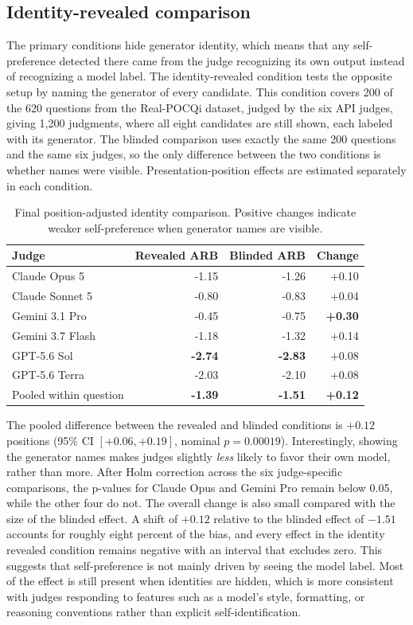 \documentclass[11pt]{article}
\begin{document}
\subsection{Identity-revealed comparison}

The primary conditions hide generator identity, which means that any self-preference detected there came from the judge recognizing its own output instead of recognizing a model label. The identity-revealed condition tests the opposite setup by naming the generator of every candidate. This condition covers 200 of the 620 questions from the Real-POCQi dataset, judged by the six API judges, giving 1,200 judgments, where all eight candidates are still shown, each labeled with its generator. The blinded comparison uses exactly the same 200 questions and the same six judges, so the only difference between the two conditions is whether names were visible. Presentation-position effects are estimated separately in each condition.


\begin{table}[htbp]
\centering
\small
\caption{Final position-adjusted identity comparison. Positive changes indicate
weaker self-preference when generator names are visible.}
\label{tab:identity}
\begin{tabular}{lrrr}
\toprule
Judge & Revealed ARB & Blinded ARB & Change \\
\midrule
Claude Opus 5 & -1.15 & -1.26 & +0.10 \\
Claude Sonnet 5 & -0.80 & -0.83 & +0.04 \\
Gemini 3.1 Pro & -0.45 & -0.75 & \textbf{+0.30} \\
Gemini 3.7 Flash & -1.18 & -1.32 & +0.14 \\
GPT-5.6 Sol & \textbf{-2.74} & \textbf{-2.83} & +0.08 \\
GPT-5.6 Terra & -2.03 & -2.10 & +0.08 \\
\midrule
Pooled within question & \textbf{-1.39} & \textbf{-1.51} & \textbf{+0.12} \\
\bottomrule
\end{tabular}
\end{table}
\FloatBarrier

The pooled difference between the revealed and blinded conditions is $+0.12$ positions (95\% CI $[+0.06,+0.19]$, nominal $p=0.00019$). Interestingly, showing the generator names makes judges slightly \textit{less} likely to favor their own model, rather than more. After Holm correction across the six judge-specific comparisons, the p-values for Claude Opus and Gemini Pro remain below 0.05, while the other four do not. The overall change is also small compared with the size of the blinded effect. A shift of $+0.12$ relative to the blinded effect of $-1.51$ accounts for roughly eight percent of the bias, and every effect in the identity revealed condition remains negative with an interval that excludes zero. This suggests that self-preference is not mainly driven by seeing the model label. Most of the effect is still present when identities are hidden, which is more consistent with judges responding to features such as a model's style, formatting, or reasoning conventions rather than explicit self-identification.
\end{document}
